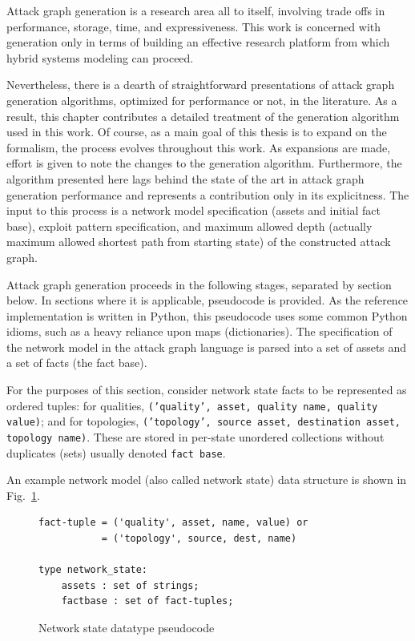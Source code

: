 Attack graph generation is a research area all to itself,
involving trade offs in performance, storage, time, and expressiveness.
This work is concerned with generation only
in terms of building an effective research platform from which hybrid systems
modeling can proceed.

Nevertheless, there is a dearth of straightforward presentations of attack 
graph generation algorithms, optimized for performance or not, in the 
literature. As a result, this chapter contributes a detailed treatment of the
generation algorithm used in this work. Of course, as a main goal of this
thesis is to expand on the formalism, the process evolves throughout this
work. As expansions are made, effort is given to note the changes to the
generation algorithm. Furthermore, the algorithm presented here lags behind the
state of the art in attack graph generation performance and represents a
contribution only in its explicitness.
The input to this
process is a network model specification (assets and initial fact base),
exploit pattern specification, and maximum allowed depth (actually maximum
allowed shortest path from starting state) of the constructed attack graph.

Attack graph generation proceeds in the following stages, separated by
section below. In sections where it is applicable, pseudocode is provided. 
As the reference
implementation is written in Python, this pseudocode uses some common Python
idioms, such as a heavy reliance upon maps (dictionaries).
The specification of the network model in the attack graph language is
parsed into a set of assets and a set of facts (the fact base). 

For the purposes
of this section, consider network state facts to be represented as ordered
tuples: for qualities, \texttt{('quality', asset, quality name, quality value)};
and for topologies, \texttt{('topology', source asset, destination asset,
topology name)}. These are stored in per-state unordered collections without duplicates
(sets) usually denoted \texttt{fact base}.

An example network model (also called network state) data structure is shown in
Fig.~\ref{fig:netstate_pc}.

\begin{figure}
\begin{lstlisting}
fact-tuple = ('quality', asset, name, value) or
           = ('topology', source, dest, name)

type network_state:
    assets : set of strings;
    factbase : set of fact-tuples;
\end{lstlisting}
\caption{Network state datatype pseudocode}
\label{fig:netstate_pc}
\end{figure}


